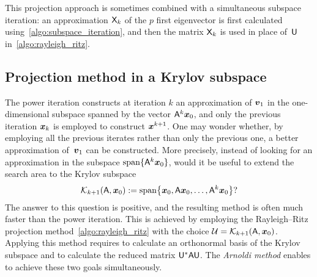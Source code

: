 This projection approach is sometimes combined with a simultaneous subspace iteration:
an approximation $\mathsf X_k$ of the $p$ first eigenvector is first calculated using~\cref{algo:subspace_iteration},
and then the matrix $\mathsf X_k$ is used in place of~$\mathsf U$ in~\cref{algo:rayleigh_ritz}.

\subsection{Projection method in a Krylov subspace}
The power iteration constructs at iteration $k$ an approximation of $\mathbf{\boldsymbol{v}}_1$ in the one-dimensional subspace spanned by the vector $\mathsf A^k \mathbf{\boldsymbol{x}}_0$,
and only the previous iteration $\mathbf{\boldsymbol{x}}_{k}$ is employed to construct $\mathbf{\boldsymbol{x}}^{k+1}$.
One may wonder whether,
by employing all the previous iterates rather than only the previous one,
a better approximation of~$\mathbf{\boldsymbol{v}}_1$ can be constructed.
More precisely, instead of looking for an approximation in the subspace $\operatorname{span} \{\mathsf A^k \mathbf{\boldsymbol{x}}_0\}$,
would it be useful to extend the search area to the Krylov subspace
\[
    \mathcal K_{k+1}(\mathsf A, \mathbf{\boldsymbol{x}}_0) := \operatorname{span} \bigl\{ \mathbf{\boldsymbol{x}}_0, \mathsf A \mathbf{\boldsymbol{x}}_0, \dotsc, \mathsf A^k \mathbf{\boldsymbol{x}}_0 \bigr\}?
\]
The answer to this question is positive,
and the resulting method is often much faster than the power iteration.
This is achieved by employing the Rayleigh--Ritz projection method~\cref{algo:rayleigh_ritz} with the choice $\mathcal U = \mathcal K_{k+1}(\mathsf A, \mathbf{\boldsymbol{x}}_0)$.
Applying this method requires to calculate an orthonormal basis of the Krylov subspace and to calculate the reduced matrix $\mathsf U^* \mathsf A \mathsf U$.
The \emph{Arnoldi method} enables to achieve these two goals simultaneously.

